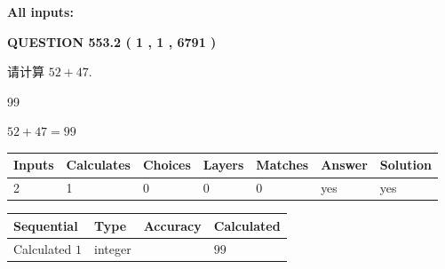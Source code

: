 \documentclass{ctexart}
\begin{document}
   
   
   
\noindent{}
   
   
   
   
\noindent\vspace{0.1in}\hspace{-0.08in} {\textbf{\Large{All inputs: }}}
   
   
  
\vspace{0.2in}
  
{\textbf{\Large{QUESTION
553.2 
 ( 1 , 1 , 6791 )
}}}
  
  
 
请计算 $ %
52 +  %
47 $.
 
 
 
\noindent{}
 
 

99
 
 
\noindent{}
 
 

 
 
 
\noindent{}
 
 

$ %
52 +  %
47=   %
99$
 
 
\noindent{}
 
 

 
   
   
   
   
\noindent\begin{tabular}{|l|l|l|l|l|l|l|}
 \hline
Inputs & Calculates & Choices & Layers & Matches & Answer & Solution \\ \hline
 2  & 
 1  & 
 0
  & 
 0  & 
 0  & 
  yes & 
  yes 
  \\ \hline
 \end{tabular}
   
   
   
   
\noindent{}
   
   
  
  
\noindent\begin{tabular}{|l|l|l|l|}
\hline
 Sequential & Type & Accuracy & Calculated \\ 
\hline
 
 
  Calculated $  1 $ & integer &  & 
  $ 99 $ 
 \\  \hline  
 \end{tabular}
   
\end{document}
